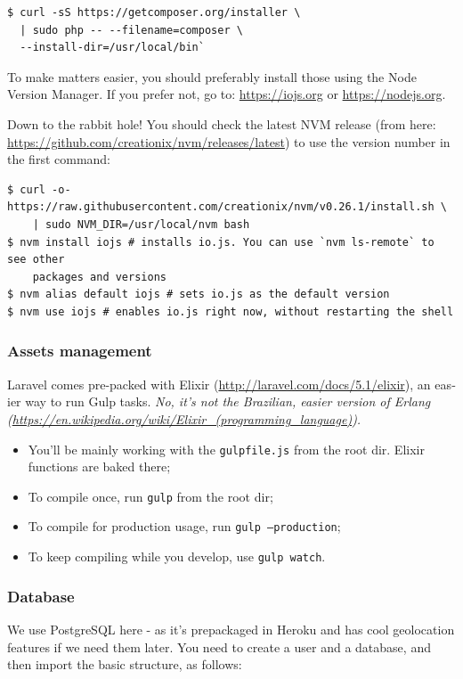 \documentclass[12pt,a4paper,twoside,hyphens,english,brazil]{abntex2}
\begin{document}
{\begin{otherlanguage}{english}
\begin{verbatim}
$ curl -sS https://getcomposer.org/installer \
  | sudo php -- --filename=composer \
  --install-dir=/usr/local/bin`
\end{verbatim}

To make matters easier, you should preferably install those using the Node Version Manager. If you prefer not, go to: \url{https://iojs.org} or \url{https://nodejs.org}.

Down to the rabbit hole! You should check the latest NVM release (from here: \url{https://github.com/creationix/nvm/releases/latest}) to use the version number in the first command:

\begin{verbatim}
$ curl -o- https://raw.githubusercontent.com/creationix/nvm/v0.26.1/install.sh \
    | sudo NVM_DIR=/usr/local/nvm bash
$ nvm install iojs # installs io.js. You can use `nvm ls-remote` to see other
    packages and versions
$ nvm alias default iojs # sets io.js as the default version
$ nvm use iojs # enables io.js right now, without restarting the shell
\end{verbatim}

\subsubsection{Assets management}
Laravel comes pre-packed with Elixir (\url{http://laravel.com/docs/5.1/elixir}), an easier way to run Gulp tasks. \emph{No, it's not the Brazilian, easier version of Erlang (\url{https://en.wikipedia.org/wiki/Elixir_(programming_language)}).}

\begin{itemize}
	\item You'll be mainly working with the \texttt{gulpfile.js} from the root dir. Elixir functions are baked there;
	\item To compile once, run \texttt{gulp} from the root dir;
	\item To compile for production usage, run \texttt{gulp --production};
	\item To keep compiling while you develop, use \texttt{gulp watch}.
\end{itemize}

\subsubsection{Database}
We use PostgreSQL here - as it's prepackaged in Heroku and has cool geolocation features if we need them later. You need to create a user and a database, and then import the basic structure, as follows:


\end{otherlanguage}}
\end{document}
